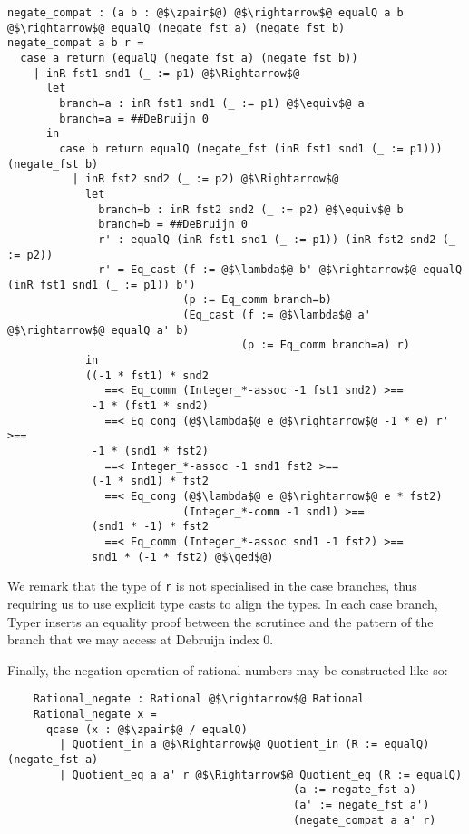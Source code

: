 \documentclass[12pt,twoside,maitrise]{dms}
\theoremstyle{definition}
\numberwithin{equation}{section}
\numberwithin{table}{chapter}
\numberwithin{figure}{chapter}
\newcommand\id[1] {\texttt{#1}}
\renewcommand\qed{\blacksquare}
\begin{document}
\begin{verbatim}
negate_compat : (a b : @$\zpair$@) @$\rightarrow$@ equalQ a b @$\rightarrow$@ equalQ (negate_fst a) (negate_fst b)
negate_compat a b r =
  case a return (equalQ (negate_fst a) (negate_fst b))
    | inR fst1 snd1 (_ := p1) @$\Rightarrow$@
      let
        branch=a : inR fst1 snd1 (_ := p1) @$\equiv$@ a
        branch=a = ##DeBruijn 0
      in
        case b return equalQ (negate_fst (inR fst1 snd1 (_ := p1))) (negate_fst b)
          | inR fst2 snd2 (_ := p2) @$\Rightarrow$@
            let
              branch=b : inR fst2 snd2 (_ := p2) @$\equiv$@ b
              branch=b = ##DeBruijn 0
              r' : equalQ (inR fst1 snd1 (_ := p1)) (inR fst2 snd2 (_ := p2))
              r' = Eq_cast (f := @$\lambda$@ b' @$\rightarrow$@ equalQ (inR fst1 snd1 (_ := p1)) b')
                           (p := Eq_comm branch=b)
                           (Eq_cast (f := @$\lambda$@ a' @$\rightarrow$@ equalQ a' b)
                                    (p := Eq_comm branch=a) r)
            in
            ((-1 * fst1) * snd2
               ==< Eq_comm (Integer_*-assoc -1 fst1 snd2) >==
             -1 * (fst1 * snd2)
               ==< Eq_cong (@$\lambda$@ e @$\rightarrow$@ -1 * e) r' >==
             -1 * (snd1 * fst2)
               ==< Integer_*-assoc -1 snd1 fst2 >==
             (-1 * snd1) * fst2
               ==< Eq_cong (@$\lambda$@ e @$\rightarrow$@ e * fst2)
                           (Integer_*-comm -1 snd1) >==
             (snd1 * -1) * fst2
               ==< Eq_comm (Integer_*-assoc snd1 -1 fst2) >==
             snd1 * (-1 * fst2) @$\qed$@)
\end{verbatim}

We remark that the type of \id{r} is not specialised in the case branches, thus
requiring us to use explicit type casts to align the types. In each case branch,
Typer inserts an equality proof between the scrutinee and the pattern of the
branch that we may access at Debruijn index 0.

Finally, the negation operation of rational numbers may be constructed like so:

\begin{verbatim}
    Rational_negate : Rational @$\rightarrow$@ Rational
    Rational_negate x =
      qcase (x : @$\zpair$@ / equalQ)
        | Quotient_in a @$\Rightarrow$@ Quotient_in (R := equalQ) (negate_fst a)
        | Quotient_eq a a' r @$\Rightarrow$@ Quotient_eq (R := equalQ)
                                            (a := negate_fst a)
                                            (a' := negate_fst a')
                                            (negate_compat a a' r)
\end{verbatim}
\end{document}
